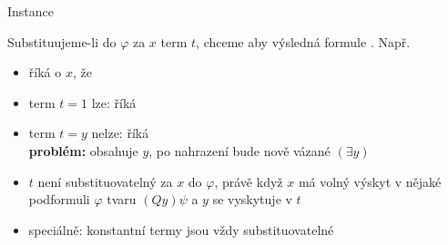 \documentclass{beamer}
\begin{document}
\begin{frame}{Instance}
    
    Substituujeme-li do $\varphi$ za $x$ term $t$, chceme aby výsledná formule .  \pause Např.  \pause 
    \begin{itemize}
        \item říká o $x$, že  \pause 
        \item term $t=1$ lze:  říká  \pause 
        \item term $t=y$ nelze:  říká \\ \pause 
        \textbf{problém:} obsahuje $y$, po nahrazení bude nově vázané $(\exists y)$ \pause 
    \end{itemize}
     \pause 
    \begin{itemize}
        \item $t$ \alert{není} substituovatelný za $x$ do $\varphi$, právě když $x$ má volný výskyt v nějaké podformuli $\varphi$ tvaru $(Qy)\psi$ a $y$ se vyskytuje v $t$ \pause 
        \item speciálně: konstantní termy jsou vždy substituovatelné
    \end{itemize}

\end{frame}
\end{document}
